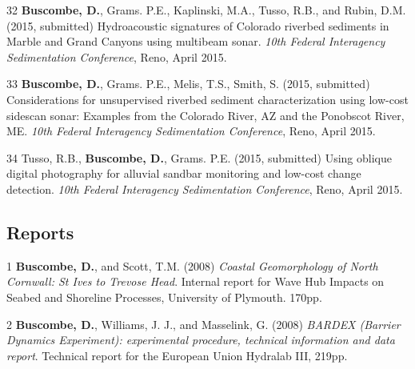 \documentclass[margin,line]{resume}
\begin{document}
\begin{resume}
\begin{footnotesize}
\begin{list1}
        \item[32] {\bf Buscombe, D.}, Grams. P.E., Kaplinski, M.A., Tusso, R.B., and Rubin, D.M. (2015, submitted) Hydroacoustic signatures of Colorado riverbed sediments in Marble and Grand Canyons using multibeam sonar. {\sl 10th Federal Interagency Sedimentation Conference}, Reno, April 2015.\\

        \item[33] {\bf Buscombe, D.}, Grams. P.E., Melis, T.S., Smith, S. (2015, submitted) Considerations for unsupervised riverbed sediment characterization using low-cost sidescan sonar: Examples from the Colorado River, AZ and the Ponobscot River, ME. {\sl 10th Federal Interagency Sedimentation Conference}, Reno, April 2015.\\

        \item[34] Tusso, R.B., {\bf Buscombe, D.}, Grams. P.E. (2015, submitted) Using oblique digital photography for alluvial sandbar monitoring and low-cost change detection. {\sl 10th Federal Interagency Sedimentation Conference}, Reno, April 2015.

	\end{list1}

        \end{footnotesize}

	\subsection{\mysidestyle Reports}
        \begin{footnotesize}
	\begin{list1}
	 
	\item[1] {\bf Buscombe, D.}, and Scott, T.M. (2008) {\sl Coastal Geomorphology of North Cornwall: St Ives to Trevose Head}. Internal report for Wave Hub Impacts on Seabed and Shoreline Processes, University of Plymouth. 170pp.\\
	\item[2] {\bf Buscombe, D.}, Williams, J. J., and Masselink, G. (2008) {\sl BARDEX (Barrier Dynamics Experiment): experimental procedure, technical information and data report}. Technical report for the European Union Hydralab III, 219pp. 

	\end{list1}
        \end{footnotesize}


\end{resume}
\end{document}
